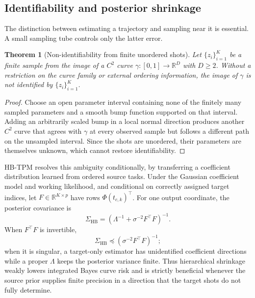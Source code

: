 \documentclass{article}
\newtheorem{theorem}{Theorem}
\begin{document}
\subsection{Identifiability and posterior shrinkage}
The distinction between estimating a trajectory and sampling near it is essential. A small sampling tube controls only the latter error.

\begin{theorem}[Non-identifiability from finite unordered shots]
	Let $\{z_i\}_{i=1}^{K}$ be a finite sample from the image of a $C^2$ curve $\gamma:[0,1]\to\mathbb{R}^{D}$ with $D\ge2$. Without a restriction on the curve family or external ordering information, the image of $\gamma$ is not identified by $\{z_i\}_{i=1}^{K}$.
\end{theorem}

\begin{proof}
	Choose an open parameter interval containing none of the finitely many sampled parameters and a smooth bump function supported on that interval. Adding an arbitrarily scaled bump in a local normal direction produces another $C^2$ curve that agrees with $\gamma$ at every observed sample but follows a different path on the unsampled interval. Since the shots are unordered, their parameters are themselves unknown, which cannot restore identifiability.
\end{proof}

HB-TPM resolves this ambiguity conditionally, by transferring a coefficient distribution learned from ordered source tasks. Under the Gaussian coefficient model and working likelihood, and conditional on correctly assigned target indices, let $F\in\mathbb{R}^{K\times p}$ have rows $\Phi(t_{c,k})^\top$. For one output coordinate, the posterior covariance is
\begin{equation}
	\Sigma_{\mathrm{HB}}
	=\left(\Lambda^{-1}+\sigma^{-2}F^\top F\right)^{-1}.
	\label{eq:hb_posterior_covariance}
\end{equation}
When $F^\top F$ is invertible,
\[
	\Sigma_{\mathrm{HB}}\preceq
	\left(\sigma^{-2}F^\top F\right)^{-1};
\]
when it is singular, a target-only estimator has unidentified coefficient directions while a proper $\Lambda$ keeps the posterior variance finite. Thus hierarchical shrinkage weakly lowers integrated Bayes curve risk and is strictly beneficial whenever the source prior supplies finite precision in a direction that the target shots do not fully determine.
\end{document}
